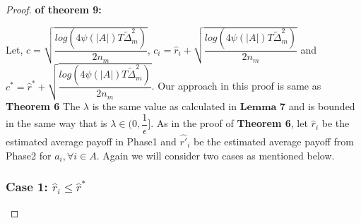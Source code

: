\begin{proof}\textbf{ of theorem 9:}


Let, $c=\sqrt{\dfrac{log({4\psi(|A|)T\tilde{\Delta}_{m}^{2}})}{2n_{m}}}$, $c_{i}= \hat{r}_{i} + \sqrt{\dfrac{log({4\psi(|A|)T\tilde{\Delta}_{m}^{2}})}{2n_{m}}}$ and
$c^{*}= \hat{r}^{*} + \sqrt{\dfrac{log({4\psi(|A|)T\tilde{\Delta}_{m}^{2}})}{2n_{m}}}$.
\newline Our approach in this proof is same as \textbf{Theorem 6}
The $\lambda$ is the same value as calculated in $\textbf{Lemma 7}$ and is bounded in the same way that is $\lambda\in (0,\dfrac{1}{\epsilon}]$. As in the proof of \textbf{Theorem 6}, let $\hat{r}_{i}$ be the estimated average payoff in Phase1 and $\hat{r'}_{i}$ be the estimated average payoff from Phase2 for $a_{i}, \forall i \in A$. Again we will consider two cases as mentioned below.


\subsubsection*{\textbf{Case 1: $\hat{r}_{i} \leq \hat{r}^{*}$}}


\end{proof}
